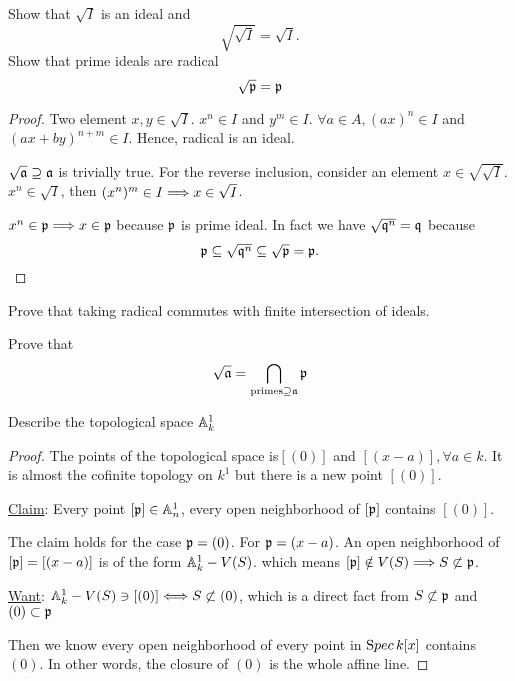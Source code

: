 \documentclass[11pt,fleqn]{book}
\begin{document}
\begin{exr}
Show that $\sqrt I$ is an ideal and
$$
\sqrt {\sqrt I}=\sqrt I.
$$
Show that prime ideals are radical
$$
\sqrt {{\mathfrak p}}={\mathfrak p}
$$
\end{exr}
\begin{proof}
Two element $x,y\in \sqrt I$.
$x^n\in I$ and $y^m\in I$. $\forall a\in A, (ax)^n\in I$ and $(ax+by)^{n+m}\in I$. Hence, radical is an ideal.

$\sqrt{{\mathfrak a}}\supseteq {\mathfrak a}$ is trivially true. For the reverse inclusion, consider an element $x\in \sqrt{\sqrt I}$. $x^n\in \sqrt I$, then $(x^n)^m\in I\Longrightarrow x\in \sqrt I$.

$x^n\in{\mathfrak p}\Longrightarrow x\in {\mathfrak p}$ because ${\mathfrak p}$ is prime ideal. 
In fact we have $\sqrt{\mathfrak q^n}=\mathfrak q$ because 
$$
{\mathfrak p}\subseteq \sqrt{\mathfrak q^n}\subseteq\sqrt{{\mathfrak p}}={\mathfrak p}.$$
\end{proof}

\begin{exr}
Prove that taking radical commutes with finite intersection of ideals.
\end{exr}

\begin{exr}
Prove that 
$$
\sqrt{{\mathfrak a}}=\bigcap_{\text{primes}\supseteq {\mathfrak a} }{\mathfrak p}
$$
\end{exr}

\begin{exr}
Describe the topological space $\mathbb A^1_k$
\end{exr}
\begin{proof}
The points of the topological space is$[(0)]$ and $[(x-a)],\forall a\in k$. It is almost the cofinite topology on $k^1$ but there is a new point $[(0)]$. 

\underline{Claim}: Every point $[{\mathfrak p}]\in \mathbb A^1_n$, every open neighborhood of $[{\mathfrak p}]$ contains $[(0)]$.

The claim holds for the case ${\mathfrak p}=(0)$. For ${\mathfrak p}=(x-a)$. An open neighborhood of $[{\mathfrak p}]=[(x-a)]$ is of the form $\mathbb A^1_k-V(S)$. which means $[{\mathfrak p}]\notin V(S)\Longrightarrow S\not \subset{\mathfrak p}$.

\underline{Want}: $\mathbb A^1_k-V(S)\ni [(0)]\Longleftrightarrow S\not \subset (0)$, which is a direct fact from $S\not \subset {\mathfrak p}$ and $(0)\subset {\mathfrak p}$

Then we know every open neighborhood of every point in ${\text Spec\,} k[x]$ contains $(0)$. In other words, the closure of $(0)$ is the whole affine line.
\end{proof}
\end{document}
